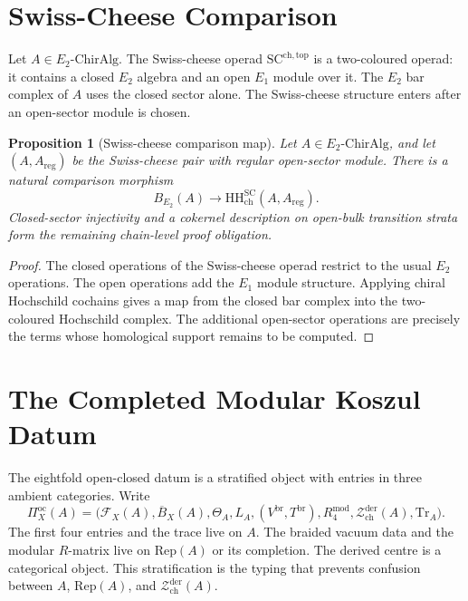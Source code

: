 \documentclass[11pt]{article}
\newtheorem{proposition}[theorem]{Proposition}
\providecommand{\Eone}{E_1}
\providecommand{\Etwo}{E_2}
\providecommand{\cF}{\mathcal{F}}
\providecommand{\cZ}{\mathcal{Z}}
\providecommand{\ChirAlg}{\mathrm{ChirAlg}}
\providecommand{\Rep}{\mathrm{Rep}}
\providecommand{\Tr}{\mathrm{Tr}}
\providecommand{\HH}{\mathrm{HH}}
\begin{document}
\section{Swiss-Cheese Comparison}

Let $A\in\Etwo\text{-}\ChirAlg$. The Swiss-cheese operad
$\mathrm{SC}^{\mathrm{ch,top}}$ is a two-coloured operad: it contains a
closed $\Etwo$ algebra and an open $\Eone$ module over it. The
$\Etwo$ bar complex of $A$ uses the closed sector alone. The
Swiss-cheese structure enters after an open-sector module is chosen.

\begin{proposition}[Swiss-cheese comparison map]
\label{prop:swiss-cheese-comparison}
Let $A\in\Etwo\text{-}\ChirAlg$, and let $(A,A_{\mathrm{reg}})$ be the
Swiss-cheese pair with regular open-sector module. There is a natural
comparison morphism
\[
  B_{\Etwo}(A)\longrightarrow
  \HH_{\mathrm{ch}}^{\mathrm{SC}}(A,A_{\mathrm{reg}}).
\]
Closed-sector injectivity and a cokernel description on open-bulk
transition strata form the remaining chain-level proof obligation.
\end{proposition}

\begin{proof}
The closed operations of the Swiss-cheese operad restrict to the usual
$\Etwo$ operations. The open operations add the $\Eone$ module
structure. Applying chiral Hochschild cochains gives a map from the
closed bar complex into the two-coloured Hochschild complex. The
additional open-sector operations are precisely the terms whose
homological support remains to be computed.
\end{proof}

\section{The Completed Modular Koszul Datum}

The eightfold open-closed datum is a stratified object with entries in
three ambient categories. Write
\[
\Pi_X^{\mathrm{oc}}(A)=
\bigl(
\cF_X(A),\overline B_X(A),\Theta_A,L_A,
(V^{\mathrm{br}},T^{\mathrm{br}}),
R_4^{\mathrm{mod}},
\cZ_{\mathrm{ch}}^{\mathrm{der}}(A),
\Tr_A
\bigr).
\]
The first four entries and the trace live on $A$. The braided vacuum
data and the modular $R$-matrix live on $\Rep(A)$ or its completion.
The derived centre is a categorical object. This stratification is the
typing that prevents confusion between $A$, $\Rep(A)$, and
$\cZ_{\mathrm{ch}}^{\mathrm{der}}(A)$.
\end{document}

